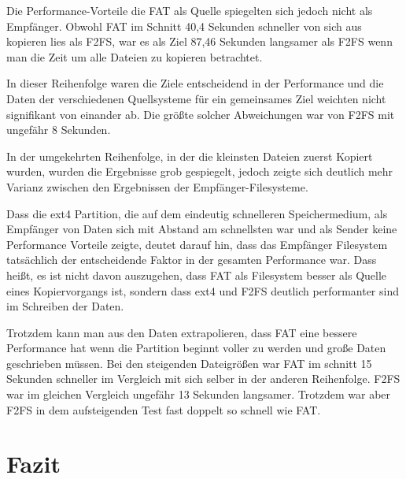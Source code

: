 \documentclass[11pt,parskip=full]{scrartcl}
\begin{document}
	Die Performance-Vorteile die FAT als Quelle spiegelten sich jedoch nicht als Empfänger. Obwohl FAT im Schnitt 40,4 Sekunden schneller von sich aus kopieren lies als F2FS, war es als Ziel 87,46 Sekunden langsamer als F2FS wenn man die Zeit um alle Dateien zu kopieren betrachtet.
	
	In dieser Reihenfolge waren die Ziele entscheidend in der Performance und die Daten der verschiedenen Quellsysteme für ein gemeinsames Ziel weichten nicht signifikant von einander ab. Die größte solcher Abweichungen war von F2FS mit ungefähr 8 Sekunden.
	
	In der umgekehrten Reihenfolge, in der die kleinsten Dateien zuerst Kopiert wurden, wurden die Ergebnisse grob gespiegelt, jedoch zeigte sich deutlich mehr Varianz zwischen den Ergebnissen der Empfänger-Filesysteme.
	
	Dass die ext4 Partition, die auf dem eindeutig schnelleren Speichermedium, als Empfänger von Daten sich mit Abstand am schnellsten war und als Sender keine Performance Vorteile zeigte, deutet darauf hin, dass das Empfänger Filesystem tatsächlich der entscheidende Faktor in der gesamten Performance war. Dass heißt, es ist nicht davon auszugehen, dass FAT als Filesystem besser als Quelle eines Kopiervorgangs ist, sondern dass ext4 und F2FS deutlich performanter sind im Schreiben der Daten.
	
	Trotzdem kann man aus den Daten extrapolieren, dass FAT eine bessere Performance hat wenn die Partition beginnt voller zu werden und große Daten geschrieben müssen. Bei den steigenden Dateigrößen war FAT im schnitt 15 Sekunden schneller im Vergleich mit sich selber in der anderen Reihenfolge. F2FS war im gleichen Vergleich ungefähr 13 Sekunden langsamer. Trotzdem war aber F2FS in dem aufsteigenden Test fast doppelt so schnell wie FAT.

\section{Fazit}
	
\end{document}
